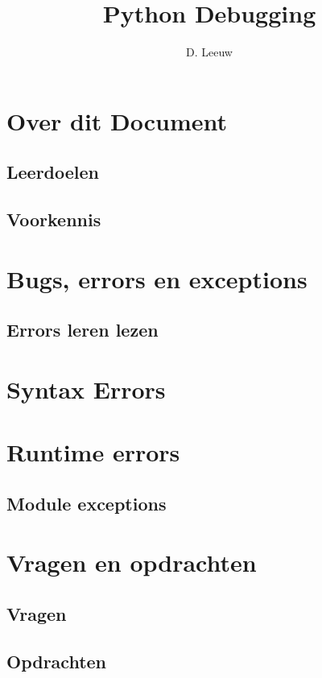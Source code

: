 \documentclass[a4paper,12pt,twoside,openright,titlepage]{article}
\author{D. Leeuw}
\title{Python Debugging}
\date{\today\\
\vfill
\raggedright
\copyright\ 2020-2025 Dennis Leeuw\\
}
\begin{document}

\maketitle


\section{Over dit Document}
\subsection{Leerdoelen}

\subsection{Voorkennis}




\section{Bugs, errors en exceptions}

\subsection{Errors leren lezen}


\section{Syntax Errors}


\section{Runtime errors}

\subsection{Module exceptions}


\section{Vragen en opdrachten}
\subsection{Vragen}

\subsection{Opdrachten}


\printindex
\end{document}
